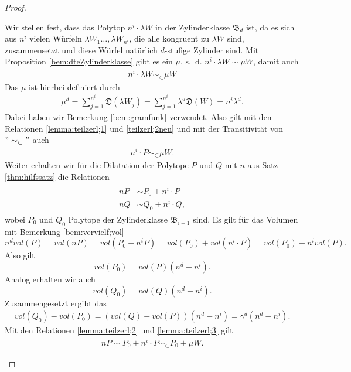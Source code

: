 \documentclass[11pt,titlepage]{article}
\theoremstyle{definition}
\theoremstyle{remark}
\begin{document}
\begin{proof}
\begin{itemize}
			Wir stellen fest, dass das Polytop $n^i\cdot \lambda W$ 
			in der Zylinderklasse $\mathfrak{B}_d$ ist, da es sich 
			aus $n^i$ vielen Würfeln $\lambda W_1\ldots,\lambda W_{n^i}$, 
			die alle kongruent zu $\lambda W$ sind, 
			zusammensetzt und diese Würfel 
			natürlich $d$-stufige Zylinder sind. Mit Proposition 
			\ref{bem:dteZylinderklasse} gibt es ein $\mu$, s.~d. 
			$n^i\cdot \lambda W\sim \mu W$, damit auch 
			\begin{align}
				n^i\cdot \lambda W\sim_{\subset} \mu W \label{teilzerl;2neu}
			\end{align}
			Das $\mu$ ist hierbei definiert durch 
			\begin{align}
				\mu^d =\sum_{j=1}^{n^i}\mathfrak{D}(\lambda W_j)
				=\sum_{j=1}^{n^i}\lambda^d \mathfrak{D}(W)=
				n^i\lambda^d. \label{lemma:teilzerl;5}
			\end{align}
			Dabei haben wir Bemerkung \ref{bem:gramfunk} 
			verwendet. Also gilt mit den Relationen \ref{lemma:teilzerl;1} und 
			\ref{teilzerl;2neu} und mit der Transitivität von $"\sim_{\subset}"$ 
			auch
			\begin{align}
				n^i\cdot P\sim_{\subset} \mu W.\label{lemma:teilzerl;2}
			\end{align}
			Weiter erhalten wir für die Dilatation der 
			Polytope $P$ und $Q$ mit $n$ aus Satz \ref{thm:hilfssatz} 
			die Relationen
			\begin{align}
				\begin{split}
					nP&\sim P_0+ n^i\cdot P \\
					nQ&\sim Q_0+ n^i\cdot Q, \label{lemma:teilzerl;3}
				\end{split}
			\end{align}
			wobei $P_0$ und $Q_0$ Polytope der Zylinderklasse 
			$\mathfrak{B}_{i+1}$ sind. Es gilt für das Volumen mit 
			Bemerkung \ref{bem:vervielf;vol} 
			\[n^d vol(P)=vol(nP)=vol(P_0+n^i P)=vol(P_0)+vol(n^i\cdot P)
			=vol(P_0)+n^i vol(P).\]
			Also gilt
			\[vol(P_0)=vol(P)(n^d -n^i).\]
			Analog erhalten wir auch
			\[vol(Q_0)=vol(Q)(n^d -n^i).\]
			Zusammengesetzt ergibt das  
			\begin{align}
				vol(Q_0)-vol(P_0)=(vol(Q)-vol(P))(n^d -n^i)=\gamma^d(n^d-n^i). \label{lemma:teilzerl;4}
			\end{align}
			Mit den Relationen \ref{lemma:teilzerl;2} und 
			\ref{lemma:teilzerl;3} gilt  
			\begin{align}
				nP\sim P_0+n^i\cdot P \sim_{\subset} P_0 + \mu W. \label{lemma:teilzerl;7}
			\end{align}

\end{itemize}
\end{proof}
\end{document}
